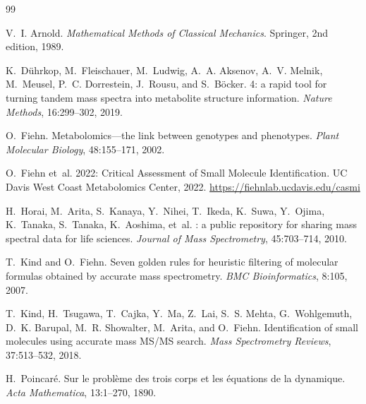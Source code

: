 \documentclass[twocolumn,10pt,a4paper]{article}
\theoremstyle{thmstyle}
\theoremstyle{definition}
\theoremstyle{remark}
\begin{document}

\begin{thebibliography}{99}

V.~I. Arnold.
\newblock \emph{Mathematical Methods of Classical Mechanics}.
\newblock Springer, 2nd edition, 1989.

K.~D\"{u}hrkop, M.~Fleischauer, M.~Ludwig, A.~A. Aksenov, A.~V. Melnik,
  M.~Meusel, P.~C. Dorrestein, J.~Rousu, and S.~B\"{o}cker.
 4: a rapid tool for turning tandem mass spectra into
  metabolite structure information.
\newblock \emph{Nature Methods}, 16:299--302, 2019.

O.~Fiehn.
\newblock Metabolomics---the link between genotypes and phenotypes.
\newblock \emph{Plant Molecular Biology}, 48:155--171, 2002.

O.~Fiehn et~al.
 2022: Critical Assessment of Small Molecule Identification.
\newblock UC Davis West Coast Metabolomics Center, 2022.
\newblock \url{https://fiehnlab.ucdavis.edu/casmi}

H.~Horai, M.~Arita, S.~Kanaya, Y.~Nihei, T.~Ikeda, K.~Suwa, Y.~Ojima,
  K.~Tanaka, S.~Tanaka, K.~Aoshima, et~al.
: a public repository for sharing mass spectral data for
  life sciences.
\newblock \emph{Journal of Mass Spectrometry}, 45:703--714, 2010.

T.~Kind and O.~Fiehn.
\newblock Seven golden rules for heuristic filtering of molecular formulas
  obtained by accurate mass spectrometry.
\newblock \emph{BMC Bioinformatics}, 8:105, 2007.

T.~Kind, H.~Tsugawa, T.~Cajka, Y.~Ma, Z.~Lai, S.~S. Mehta, G.~Wohlgemuth,
  D.~K. Barupal, M.~R. Showalter, M.~Arita, and O.~Fiehn.
\newblock Identification of small molecules using accurate mass {MS/MS}
  search.
\newblock \emph{Mass Spectrometry Reviews}, 37:513--532, 2018.

H.~Poincar\'{e}.
\newblock Sur le probl\`{e}me des trois corps et les \'{e}quations de la
  dynamique.
\newblock \emph{Acta Mathematica}, 13:1--270, 1890.


\end{thebibliography}
\end{document}
